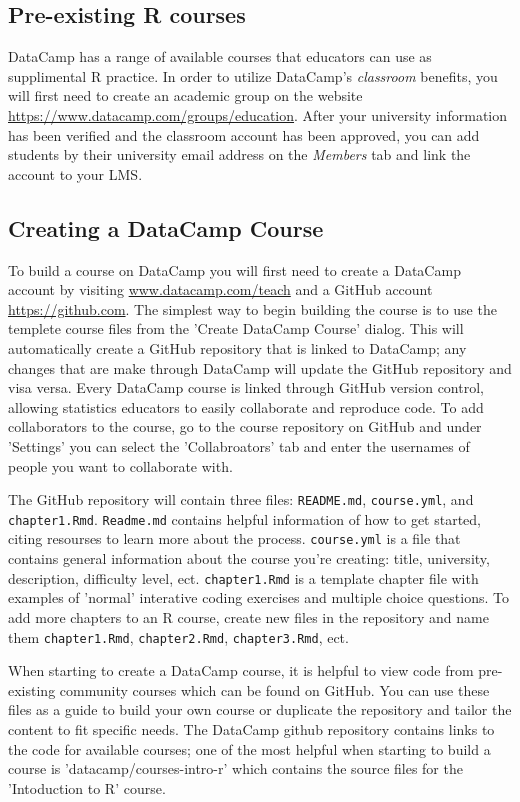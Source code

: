 \documentclass[12pt]{article}
\begin{document}
\subsection{Pre-existing R courses}
DataCamp has a range of available courses that educators can use as supplimental R practice. In order to utilize 
DataCamp's \textit{classroom} benefits, you will first need to create an academic group on the website \url{https://www.datacamp.com/groups/education}.
After your university information has been verified and the classroom account has been approved, you can add students by their university
email address on the \textit{Members} tab and link the account to your LMS.



\subsection{Creating a DataCamp Course}
To build a course on DataCamp you will first need to create a DataCamp account by visiting \url{www.datacamp.com/teach} and
a GitHub account \url{https://github.com}. The simplest way to begin building the course is to use the templete course files from the 'Create
DataCamp Course' dialog. This will automatically create a GitHub repository that is linked to DataCamp; any changes that are
make through DataCamp will update the GitHub repository and visa versa. Every DataCamp course is linked through GitHub version control,
allowing statistics educators to easily collaborate and reproduce code. To add collaborators to the course, go to the course repository
on GitHub and under 'Settings' you can select the 'Collabroators' tab and enter the usernames of people you want to collaborate with.



The GitHub repository will contain three files: \texttt{README.md}, \texttt{course.yml}, and \texttt{chapter1.Rmd}.
\texttt{Readme.md} contains helpful information of how to get started, citing resourses to learn more about the process.
\texttt{course.yml} is a file that contains general information about the course you're creating: title, university, description,
difficulty level, ect.
\texttt{chapter1.Rmd} is a template chapter file with examples of 'normal' interative coding exercises and multiple choice questions.
To add more chapters to an R course, create new files in the repository and name them \texttt{chapter1.Rmd}, \texttt{chapter2.Rmd},
\texttt{chapter3.Rmd}, ect.

When starting to create a DataCamp course, it is helpful to view code from pre-existing community courses which can be found on GitHub.
You can use these files as a guide to build your own course or duplicate the repository and tailor the content to fit specific needs.
The DataCamp github repository contains links to the code for available courses; one of the most helpful when starting to build a course 
is 'datacamp/courses-intro-r' which contains the source files for the 'Intoduction to R' course.
\end{document}
